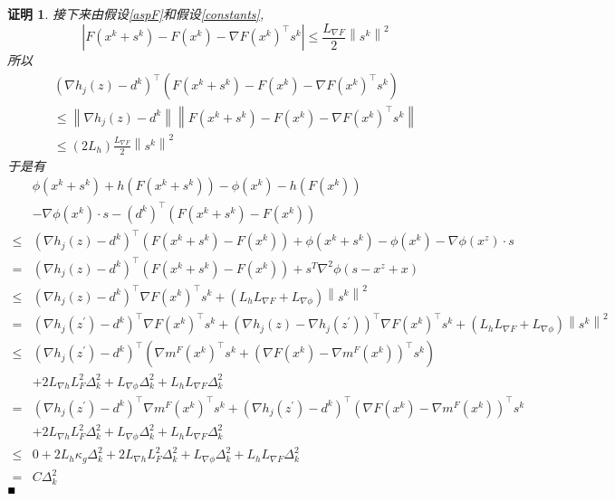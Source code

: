 \documentclass[macfonts]{njuthesis}
\newtheorem*{Proof}{证明}
\begin{document}
\begin{Proof}
接下来由假设\ref{aspF}和假设\ref{constants}, 
$$
\left|F(x^{k}+s^{k})-F(x^{k})-\nabla F(x^{k})^{\top} s^{k}\right| \leq \frac{L_{\nabla F}}{2}\left\|s^{k}\right\|^{2}
$$
所以
$$
\begin{array}{l}
\left(\nabla h_{j}(z)-d^{k}\right)^{\top}\left(F(x^{k}+s^{k})-F(x^{k})-\nabla F(x^{k})^{\top} s^{k}\right) \\
\leq\left\|\nabla h_{j}(z)-d^{k}\right\|\left\|F(x^{k}+s^{k})-F(x^{k})-\nabla F(x^{k})^{\top} s^{k}\right\| \\
\leq\left(2 L_{h}\right) \frac{L_{\nabla F}}{2}\left\|s^{k}\right\|^{2}
\end{array}
$$
于是有
$$
\begin{aligned}
& \phi(x^k+s^k)+h(F(x^{k}+s^{k}))-\phi(x^k)-h(F(x^{k}))\\
&-\nabla\phi(x^k)\cdot s-\left(d^{k}\right)^{\top}\left(F(x^{k}+s^{k})-F(x^{k})\right) \\
\leq &\left(\nabla h_{j}(z)-d^{k}\right)^{\top}\left(F(x^{k}+s^{k})-F(x^{k})\right) +\phi(x^k+s^k)-\phi(x^k)-\nabla\phi(x^z)\cdot s\\
= &\left(\nabla h_{j}(z)-d^{k}\right)^{\top}\left(F(x^{k}+s^{k})-F(x^{k})\right) +s^T\nabla^2\phi (s-x^z+x)\\
\leq &\left(\nabla h_{j}(z)-d^{k}\right)^{\top} \nabla F(x^{k})^{\top} s^{k}+\left(L_{h} L_{\nabla F}+L_{\nabla \phi}\right)\left\|s^{k}\right\|^{2} \\
=&\left(\nabla h_{j}\left(z^{\prime}\right)-d^{k}\right)^{\top} \nabla F(x^{k})^{\top} s^{k}+\left(\nabla h_{j}(z)-\nabla h_{j}\left(z^{\prime}\right)\right)^{\top} \nabla F(x^{k})^{\top} s^{k}+\left(L_{h} L_{\nabla F}+L_{\nabla \phi}\right)\left\|s^{k}\right\|^{2} \\
\leq &\left(\nabla h_{j}\left(z^{\prime}\right)-d^{k}\right)^{\top}\left(\nabla m^F(x^{k})^{\top} s^{k}+\left(\nabla F(x^{k})-\nabla m^F(x^{k})\right)^{\top} s^{k}\right) \\
&+2 L_{\nabla h} L_{F}^{2} \Delta_{k}^{2}+L_{\nabla\phi}\Delta_k^2+L_{h} L_{\nabla F} \Delta_{k}^{2} \\
=&\left(\nabla h_{j}\left(z^{\prime}\right)-d^{k}\right)^{\top} \nabla m^F(x^{k})^{\top} s^{k}+\left(\nabla h_{j}\left(z^{\prime}\right)-d^{k}\right)^{\top}\left(\nabla F(x^{k})-\nabla m^F(x^{k})\right)^{\top} s^{k} \\
&+2 L_{\nabla h} L_{F}^{2} \Delta_{k}^{2}+L_{\nabla\phi}\Delta_k^2+L_{h} L_{\nabla F} \Delta_{k}^{2} \\
\leq & 0+2 L_{h} \kappa_{g} \Delta_{k}^{2}+2 L_{\nabla h} L_{F}^{2} \Delta_{k}^{2}+L_{\nabla\phi}\Delta_k^2+L_{h} L_{\nabla F} \Delta_{k}^{2} \\
=& C \Delta_{k}^{2}
\end{aligned}
$$
$\hfill\blacksquare$
\end{Proof}
\end{document}
